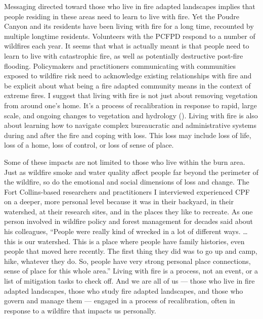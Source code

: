 \documentclass[
]{article}
\begin{document}
Messaging directed toward those who live in fire adapted landscapes implies that people residing in these areas need to learn to live with fire. Yet the Poudre Canyon and its residents have been living with fire for a long time, recounted by multiple longtime residents. Volunteers with the PCFPD respond to a number of wildfires each year. It seems that what is actually meant is that people need to learn to live with catastrophic fire, as well as potentially destructive post-fire flooding. Policymakers and practitioners communicating with communities exposed to wildfire risk need to acknowledge existing relationships with fire and be explicit about what being a fire adapted community means in the context of extreme fires. I suggest that living with fire is not just about removing vegetation from around one's home. It's a process of recalibration in response to rapid, large scale, and ongoing changes to vegetation and hydrology (). Living with fire is also about learning how to navigate complex bureaucratic and administrative systems during and after the fire and coping with loss. This loss may include loss of life, loss of a home, loss of control, or loss of sense of place.

Some of these impacts are not limited to those who live within the burn area. Just as wildfire smoke and water quality affect people far beyond the perimeter of the wildfire, so do the emotional and social dimensions of loss and change. The Fort Collins-based researchers and practitioners I interviewed experienced CPF on a deeper, more personal level because it was in their backyard, in their watershed, at their research sites, and in the places they like to recreate. As one person involved in wildfire policy and forest management for decades said about his colleagues, ``People were really kind of wrecked in a lot of different ways. \ldots this is our watershed. This is a place where people have family histories, even people that moved here recently. The first thing they did was to go up and camp, hike, whatever they do. So, people have very strong personal place connections, sense of place for this whole area.'' Living with fire is a process, not an event, or a list of mitigation tasks to check off. And we are all of us --- those who live in fire adapted landscapes, those who study fire adapted landscapes, and those who govern and manage them --- engaged in a process of recalibration, often in response to a wildfire that impacts us personally.
\end{document}
